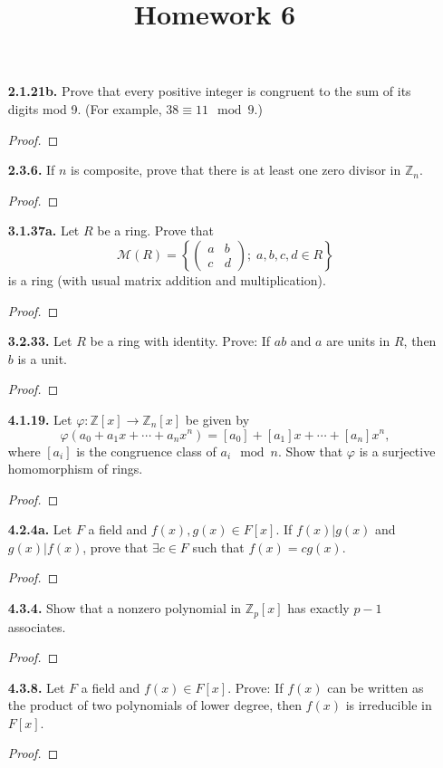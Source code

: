 \documentclass[12pt]{article}
\title{Homework 6}
\newcommand{\zee}{\mathbb{Z}}
\begin{document}
\begin{itemize}
\item[\textbf{ 2.1.21b.}] Prove that every positive integer is congruent to the sum of its digits mod 9. (For example, $38\equiv 11\mod 9$.)
\begin{proof}
\end{proof}

\item[\textbf{ 2.3.6.}] If $n$ is composite, prove that there is at least one zero divisor in $\zee_n$.
\begin{proof}
\end{proof}

\item[\textbf{ 3.1.37a.}] Let $R$ be a ring. Prove that \[ \mathcal{M}(R) = \left \{ \begin{pmatrix} a & b\\ c & d \end{pmatrix}; \; a,b,c,d\in R \right \} \] is a ring (with usual matrix addition and multiplication).
\begin{proof}
\end{proof}

\item[\textbf{ 3.2.33.}] Let $R$ be a ring with identity. Prove: If $ab$ and $a$ are units in $R$, then $b$ is a unit.
\begin{proof}
\end{proof}

\item[\textbf{ 4.1.19.}] Let $\varphi : \zee[x]\to \zee_n[x]$ be given by \[\varphi(a_0+a_1x+\dotsb+{a_n}{x^n})=[a_0]+[a_1]x+\dotsb+[a_n]x^n,\] where $[a_i]$ is the congruence class of $a_i \mod n$. Show that $\varphi$ is a surjective homomorphism of rings.
\begin{proof}
\end{proof}

\item[\textbf{ 4.2.4a.}] Let $F$ a field and $f(x), g(x)\in F[x]$. If $f(x)|g(x)$ and $g(x)|f(x)$, prove that $\exists c\in F$ such that $f(x)=cg(x)$.
\begin{proof}
\end{proof}

\item[\textbf{ 4.3.4.}] Show that a nonzero polynomial in $\zee_p[x]$ has exactly $p-1$ associates.
\begin{proof}
\end{proof}

\item[\textbf{ 4.3.8.}] Let $F$ a field and $f(x)\in F[x]$. Prove: If $f(x)$ can be written as the product of two polynomials of lower degree, then $f(x)$ is irreducible in $F[x]$.
\begin{proof}
\end{proof}


\end{itemize}
\end{document}
